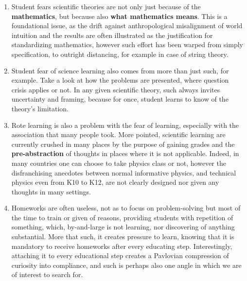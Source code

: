 \documentclass[10pt,a4paper]{article}
\begin{document}
\begin{enumerate}
    \item Student fears scientific theories are not only just because of the \textbf{mathematics}, but because also \textbf{what mathematics means}. This is a foundational issue, as the drift against anthropological misalignment of world intuition and the results are often illustrated as the justification for standardizing mathematics, however such effort has been warped from simply specification, to outright distancing, for example in case of string theory. 
    \item Student fear of science learning also comes from more than just such, for example. Take a look at how the problems are presented, where question crisis applies or not. In any given scientific theory, such always invites uncertainty and framing, because for once, student learns to know of the theory's limitation. 
    \item Rote learning is also a problem with the fear of learning, especially with the association that many people took. More pointed, scientific learning are currently crushed in many places by the purpose of gaining grades and the \textbf{pre-abstraction} of thoughts in places where it is not applicable. Indeed, in many countries one can choose to take physics class or not, however the disfranchising anecdotes between normal informative physics, and technical physics even from K10 to K12, are not clearly designed nor given any thoughts in many settings. 
    \item Homeworks are often useless, not as to focus on problem-solving but most of the time to train or given of reasons, providing students with repetition of something, which, by-and-large is not learning, nor discovering of anything substantial. More that such, it creates pressure to learn, knowing that it is mandatory to receive homeworks after every educating step. Interestingly, attaching it to every educational step creates a Pavlovian compression of curiosity into compliance, and such is perhaps also one angle in which we are of interest to search for. 

\end{enumerate}
\end{document}
